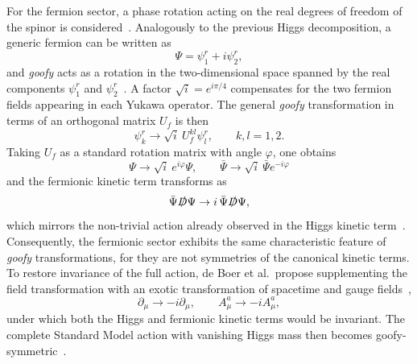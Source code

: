 \documentclass[a4paper, 11pt]{article}
\begin{document}
For the fermion sector, a phase rotation acting on the real degrees of freedom of the spinor is considered~\cite{Trautner_goofy1,goofy2}. Analogously to the previous Higgs decomposition, a generic fermion can be written as
\begin{equation*}
\Psi=\psi_1^r+i\psi_2^r,
\end{equation*}
and \textit{goofy} acts as a rotation in the two-dimensional space spanned by the real components $\psi_1^r$ and $\psi_2^r$~\cite{goofy2}. A factor $\sqrt{i}=e^{i\pi/4}$ compensates for the two fermion fields appearing in each Yukawa operator. The general \textit{goofy} transformation in terms of an orthogonal matrix $U_f$ is then
\begin{equation*}
    \psi_k^r \to \sqrt{i}\ U_{f}^{kl}\psi_l^r,\qquad k,l=1,2.
\end{equation*}
Taking $U_f$ as a standard rotation matrix with angle $\varphi$, one obtains~\cite{goofy2}
\begin{equation*}
    \Psi\to\sqrt{i}\ e^{i\varphi}\Psi, \qquad \bar{\Psi}\to\sqrt{i}\ \bar{\Psi}e^{-i\varphi}
\end{equation*}
and the fermionic kinetic term transforms as
\begin{equation*}
    \bar{\Psi}\slashed{D}\Psi \to i\, \bar{\Psi}\slashed{D}\Psi,
    \label{eq:Yukawa_kinetic}
\end{equation*}
which mirrors the non-trivial action already observed in the Higgs kinetic term~\cite{goofy2}. Consequently, the fermionic sector exhibits the same characteristic feature of \textit{goofy} transformations, for they are not symmetries of the canonical kinetic terms. To restore invariance of the full action, de Boer et al.\ propose supplementing the field transformation with an exotic transformation of spacetime and gauge fields~\cite{goofy2},
\begin{equation*}
    \partial_\mu\to-i\partial_\mu,\qquad
    A_\mu^{a} \to-iA_\mu^{a},
\end{equation*}
under which both the Higgs and fermionic kinetic terms would be invariant. The complete Standard Model action with vanishing Higgs mass then becomes goofy-symmetric~\cite{goofy2}. 
\end{document}
